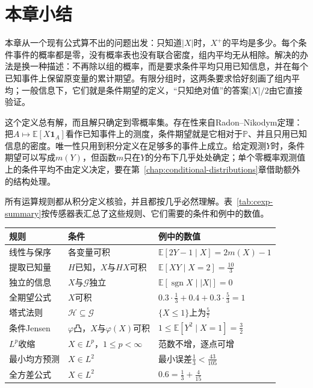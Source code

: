 \section{本章小结}
\label{sec:cexp-summary}

本章从一个现有公式算不出的问题出发：只知道$\lvert X\rvert$时，$X^{+}$的平均是多少。每个条件事件的概率都是零，没有概率表也没有联合密度，组内平均无从相除。解决的办法是换一种描述：不再除以组的概率，而是要求条件平均只用已知信息，并在每个已知事件上保留原变量的累计期望。有限分组时，这两条要求恰好刻画了组内平均；一般信息下，它们就是条件期望的定义，“只知绝对值”的答案$\lvert X\rvert/2$由它直接验证。

这个定义总有解，而且解只确定到零概率集。存在性来自Radon--Nikodym定理：把$A\mapsto\mathbb{E}[X\mathbf{1}_{A}]$看作已知事件上的测度，条件期望就是它相对于$\mathbb{P}$、并且只用已知信息的密度。唯一性只用到积分定义在足够多的事件上成立。给定观测$Y$时，条件期望可以写成$m(Y)$，但函数$m$只在$Y$的分布下几乎处处确定；单个零概率观测值上的条件平均不由定义决定，要在第~\ref{chap:conditional-distributions}章借助额外的结构处理。

所有运算规则都从积分定义核验，并且都按几乎必然理解。表~\ref{tab:cexp-summary}按传感器表汇总了这些规则、它们需要的条件和例中的数值。

\begin{BookInlineTable}
  \centering
  \caption{条件期望的规则（传感器表，$m(X)=\mathbb{E}[Y\mid X]$）}
  \label{tab:cexp-summary}
  \begin{tabular}{lll}
    \toprule
    规则 & 条件 & 例中的数值 \\
    \midrule
    线性与保序 & 各变量可积 & $\mathbb{E}[2Y-1\mid X]=2m(X)-1$ \\
    提取已知量 & $H$已知，$X$与$HX$可积 & $\mathbb{E}[XY\mid X=2]=\tfrac{10}{3}$ \\
    独立的信息 & $X$与$\mathcal{G}$独立 & $\mathbb{E}[\operatorname{sgn}X\mid\lvert X\rvert]=0$ \\
    全期望公式 & $X$可积 & $0.3\cdot\tfrac13+0.4+0.3\cdot\tfrac53=1$ \\
    塔式法则 & $\mathcal{H}\subseteq\mathcal{G}$ & $\{X\leq1\}$上为$\tfrac57$ \\
    条件Jensen & $\varphi$凸，$X$与$\varphi(X)$可积 & $1\leq\mathbb{E}[Y^{2}\mid X=1]=\tfrac32$ \\
    $L^{p}$收缩 & $X\in L^{p}$，$1\leq p<\infty$ & 范数不增，逐点可增 \\
    最小均方预测 & $X\in L^{2}$ & 最小误差$\tfrac13<\tfrac{43}{105}$ \\
    全方差公式 & $X\in L^{2}$ & $0.6=\tfrac13+\tfrac{4}{15}$ \\
    \bottomrule
  \end{tabular}
\end{BookInlineTable}

